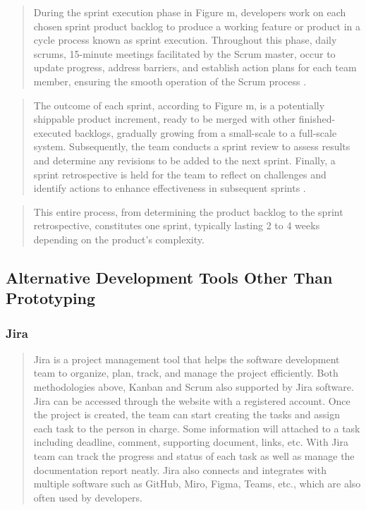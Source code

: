 \documentclass[12pt,a4paper]{article}
\begin{document}
\begin{quote}
During the sprint execution phase in Figure m, developers work on each chosen sprint product backlog to produce a working feature or product in a cycle process known as sprint execution. Throughout this phase, daily scrums, 15-minute meetings facilitated by the Scrum master, occur to update progress, address barriers, and establish action plans for each team member, ensuring the smooth operation of the Scrum process \citep{question_4.3}. 
\end{quote}

\begin{quote}
The outcome of each sprint, according to Figure m, is a potentially shippable product increment, ready to be merged with other finished-executed backlogs, gradually growing from a small-scale to a full-scale system. Subsequently, the team conducts a sprint review to assess results and determine any revisions to be added to the next sprint. Finally, a sprint retrospective is held for the team to reflect on challenges and identify actions to enhance effectiveness in subsequent sprints \citep{question_4.3}. 
\end{quote}

\begin{quote}
This entire process, from determining the product backlog to the sprint retrospective, constitutes one sprint, typically lasting 2 to 4 weeks depending on the product's complexity.
\end{quote}

\subsection{Alternative Development Tools Other Than Prototyping}

\subsubsection{Jira}

\begin{quote}
Jira is a project management tool that helps the software development team to organize, plan, track, and manage the project efficiently. Both methodologies above, Kanban and Scrum also supported by Jira software. Jira can be accessed through the website with a registered account. Once the project is created, the team can start creating the tasks and assign each task to the person in charge. Some information will attached to a task including deadline, comment, supporting document, links, etc. With Jira team can track the progress and status of each task as well as manage the documentation report neatly. Jira also connects and integrates with multiple software such as GitHub, Miro, Figma, Teams, etc., which are also often used by developers.
\end{quote}
\end{document}
